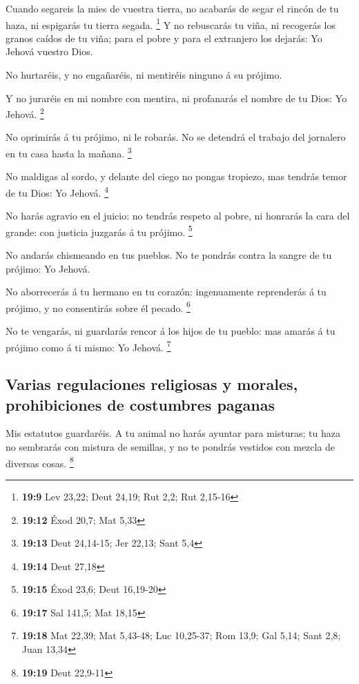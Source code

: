  Cuando segareis la mies de vuestra tierra, no acabarás de
segar el rincón de tu haza, ni espigarás tu tierra segada. \footnote{\textbf{19:9}
  Lev 23,22; Deut 24,19; Rut 2,2; Rut 2,15-16}  Y no
rebuscarás tu viña, ni recogerás los granos caídos de tu viña; para el
pobre y para el extranjero los dejarás: Yo Jehová vuestro Dios.

 No hurtaréis, y no engañaréis, ni mentiréis ninguno á su
prójimo.

 Y no juraréis en mi nombre con mentira, ni profanarás el
nombre de tu Dios: Yo Jehová. \footnote{\textbf{19:12} Éxod 20,7; Mat
  5,33}

 No oprimirás á tu prójimo, ni le robarás. No se detendrá
el trabajo del jornalero en tu casa hasta la mañana. \footnote{\textbf{19:13}
  Deut 24,14-15; Jer 22,13; Sant 5,4}

 No maldigas al sordo, y delante del ciego no pongas
tropiezo, mas tendrás temor de tu Dios: Yo Jehová. \footnote{\textbf{19:14}
  Deut 27,18}

 No harás agravio en el juicio: no tendrás respeto al
pobre, ni honrarás la cara del grande: con justicia juzgarás á tu
prójimo. \footnote{\textbf{19:15} Éxod 23,6; Deut 16,19-20}

 No andarás chismeando en tus pueblos. No te pondrás contra
la sangre de tu prójimo: Yo Jehová.

 No aborrecerás á tu hermano en tu corazón: ingenuamente
reprenderás á tu prójimo, y no consentirás sobre él pecado. \footnote{\textbf{19:17}
  Sal 141,5; Mat 18,15}

 No te vengarás, ni guardarás rencor á los hijos de tu
pueblo: mas amarás á tu prójimo como á ti mismo: Yo Jehová. \footnote{\textbf{19:18}
  Mat 22,39; Mat 5,43-48; Luc 10,25-37; Rom 13,9; Gal 5,14; Sant 2,8;
  Juan 13,34}

\hypertarget{varias-regulaciones-religiosas-y-morales-prohibiciones-de-costumbres-paganas}{%
\subsection{Varias regulaciones religiosas y morales, prohibiciones de
costumbres
paganas}\label{varias-regulaciones-religiosas-y-morales-prohibiciones-de-costumbres-paganas}}

 Mis estatutos guardaréis. A tu animal no harás ayuntar
para misturas; tu haza no sembrarás con mistura de semillas, y no te
pondrás vestidos con mezcla de diversas cosas. \footnote{\textbf{19:19}
  Deut 22,9-11}

